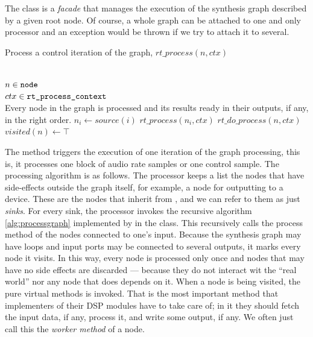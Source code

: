 The  class is a \emph{facade} that manages the execution of the synthesis graph
described by a given root node. Of course, a whole graph can be
attached to one and only processor and an exception would be thrown if
we try to attach it to several.

\begin{algorithm}
  \caption{Process a control iteration of the graph, $rt\_process (n,
    ctx)$}
\label{alg:processgraph}
\begin{algorithmic}
  \REQUIRE $\;$\\
  $n \in \mbox{\texttt{node}}$ \\
  $ctx \in \mbox{\texttt{rt\_process\_context}}$
  \ENSURE $\;$\\Every node in the graph is processed and its results ready in their
  outputs, if any, in the right order.
  \medskip
  \STATE $n_i \gets source (i)$
  \STATE $rt\_process (n_i, ctx)$
  \ENDIF
  \ENDFOR
  \STATE $rt\_do\_process (n, ctx)$
  \STATE $visited (n) \gets \top$
  \ENDIF
\end{algorithmic}
\end{algorithm}

The  method triggers the execution of one
iteration of the graph processing, this is, it processes one block of
audio rate samples or one control sample. The processing algorithm is
as follows. The processor keeps a list the nodes that have
side-effects outside the graph itself, for example, a node for
outputting to a device. These are the nodes that inherit from
, and we can refer to them as just 
\emph{sinks}. For every sink, the processor invokes the recursive
algorithm \ref{alg:processgraph} implemented by  in
the  class. This recursively calls the process method of
the nodes connected to one's input. Because the synthesis graph may
have loops and input ports may be connected to several outputs, it
marks every node it visits. In this way, every node is processed only
once and nodes that may have no side effects are discarded --- because
they do not interact wit the ``real world'' nor any node that does
depends on it. When a node is being visited, the pure virtual
 methods is invoked. That is the most important
method that implementers of their DSP modules have to take care of; in
it they should fetch the input data, if any, process it, and write
some output, if any. We often just call this the \emph{worker method}
of a node.

